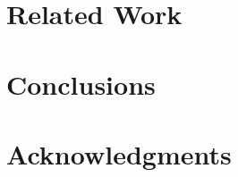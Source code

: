 \documentclass{sig-alternate}
\begin{document}
\section{Related Work}

\section{Conclusions}


\section{Acknowledgments}


%

%
%
\end{document}
